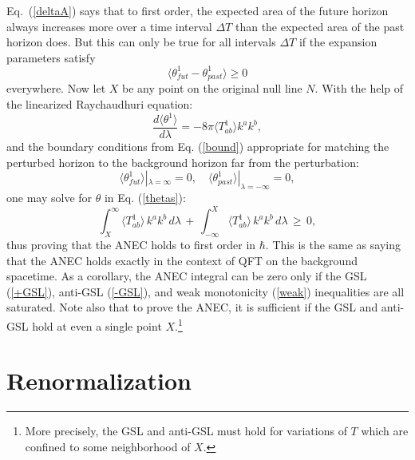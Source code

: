\documentclass[11pt]{article}
\begin{document}
Eq.~(\ref{deltaA}) says that to first order, the expected area of the future horizon always increases more over a time interval $\Delta T$ than the expected area of the past horizon does.  But this can only be true for all intervals $\Delta T$ if the expansion parameters satisfy
\begin{equation}\label{thetas} 
\langle \theta^{1}_{fut} - \theta^{1}_{past} \rangle \ge 0
\end{equation}
everywhere.  Now let $X$ be any point on the original null line $N$.  With the help of the linearized Raychaudhuri equation:
\begin{equation}\label{linray}
\frac{d \langle \theta^{1} \rangle }{d\lambda} = -8\pi \langle T_{ab}^{1} \rangle k^a k^b,
\end{equation}
and the boundary conditions from Eq. (\ref{bound}) appropriate for matching the perturbed horizon to the background horizon far from the perturbation:
\begin{equation}
\langle \theta^{1}_{fut} \rangle |_{\lambda = \infty} = 0,\quad \langle \theta^{1}_{past} \rangle |_{\lambda = -\infty} = 0,
\end{equation}
one may solve for $\theta$ in Eq. (\ref{thetas}):
\begin{equation}\label{ANEC2}
\int_X^\infty \langle T_{ab}^{1} \rangle \, k^a k^b\,d\lambda 
\,+\, \int_{-\infty}^X \langle T_{ab}^{1} \rangle \,k^a k^b\,d\lambda \,\ge\, 0,
\end{equation}
thus proving that the ANEC holds to first order in $\hbar$.  This is the same as saying that the ANEC holds exactly in the context of QFT on the background spacetime.  As a corollary, the ANEC integral can be zero only if the GSL (\ref{+GSL}), anti-GSL (\ref{-GSL}), and weak monotonicity (\ref{weak}) inequalities are all saturated.  Note also that to prove the ANEC, it is sufficient if the GSL and anti-GSL hold at even a single point $X$.\footnote{More precisely, the GSL and anti-GSL must hold for variations of $T$ which are confined to some neighborhood of $X$.}

\section{Renormalization}\label{ren}
\end{document}
